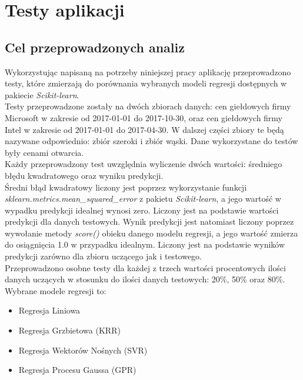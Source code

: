 
\chapter{Testy aplikacji}

\section{Cel przeprowadzonych analiz}

Wykorzystując napisaną na potrzeby niniejszej pracy aplikację przeprowadzono testy, które zmierzają do porównania wybranych modeli regresji dostępnych w pakiecie \textit{Scikit-learn}.\\

Testy przeprowadzone zostały na dwóch zbiorach danych: cen giełdowych firmy Microsoft w zakresie od 2017-01-01 do 2017-10-30, oraz cen giełdowych firmy Intel w zakresie od 2017-01-01 do 2017-04-30.
W dalszej części zbiory te będą nazywane odpowiednio: zbiór szeroki i zbiór wąski.
Dane wykorzystane do testów były cenami otwarcia.\\

Każdy przeprowadzony test uwzględnia wyliczenie dwóch wartości: średniego błędu kwadratowego oraz wyniku predykcji.\\

Średni błąd kwadratowy liczony jest poprzez wykorzystanie funkcji \textit{sklearn.metrics.mean\_squared\_error} z pakietu \textit{Scikit-learn}, a jego wartość w wypadku predykcji idealnej wynosi zero.
Liczony jest na podstawie wartości predykcji dla danych testowych.
Wynik predykcji jest natomiast liczony poprzez wywołanie metody \textit{score()} obieku danego modelu regresji, a jego wartość zmierza do osiągnięcia 1.0 w przypadku idealnym.
Liczony jest na podstawie wyników predykcji zarówno dla zbioru uczącego jak i testowego.\\

Przeprowadzono osobne testy dla każdej z trzech wartości procentowych ilości danych uczących w stosunku do ilości danych testowych: 20\%, 50\% oraz 80\%.\\

Wybrane modele regresji to:
\begin{itemize}
 \item Regresja Liniowa
 \item Regresja Grzbietowa (KRR)
 \item Regresja Wektorów Nośnych (SVR)
 \item Regresja Procesu Gaussa (GPR)
\end{itemize}

